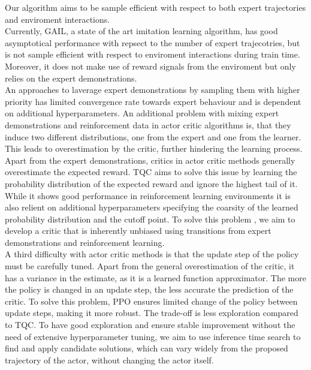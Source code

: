 Our algorithm aims to be sample efficient with respect to both expert trajectories and enviroment interactions. \\

Currently, GAIL, a state of the art imitation learning algorithm, has good asymptotical performance with repsect to the number of expert trajecotries, but is not sample efficient 
with respect to enviroment interactions during train time. Moreover, it does not make use of reward signals from the enviroment but only relies on the expert demonstrations.\\ 

An approaches to laverage expert demonstrations by sampling them with higher priority \cite{vecerik2018leveraging} has limited convergence rate towards expert behaviour and is dependent on additional hyperparameters. 
An additional problem with mixing expert demonstrations and reinforcement data in actor critic algorithms is, that they induce two different distributions, one from the expert and one from 
the learner. This leads to overestimation by the critic, further hindering the learning process. \\

Apart from the expert demonstrations, critics in actor critic methods generally overestimate the expected reward. TQC \cite{TQC_Paper} aims to solve this issue by learning the 
probability distribution of the expected reward and ignore the highest tail of it. While it shows good performance in reinforcement learning environments 
it is also relient on additional hyperparameters 
specifying the coarsity of the learned probability distribution and the cutoff point. To solve this problem , we aim to develop a critic that is inherently unbiased using transitions from expert demonstrations 
and reinforcement learning.\\

A third difficulty with actor critic methods is that the update step of the policy must be carefully tuned. Apart from the general overestimation of the critic, it has a variance in the estimate, 
as it is a learned function approximator. The more the policy is changed in an update step, the less accurate the prediction of the critic. To solve this problem, PPO ensures limited change of the policy 
between update steps, making it more robust. The trade-off is less exploration compared to TQC. To have good exploration 
and ensure stable improvement without the need of extensive hyperparameter tuning, we aim to use inference time search to find and apply candidate solutions, which can vary widely from the 
proposed trajectory of the actor, without changing the actor itself. \\

